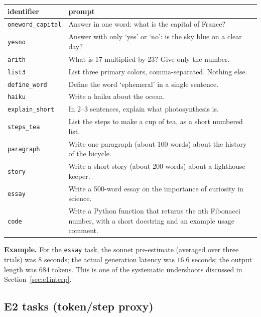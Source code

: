\documentclass[11pt]{article}
\newcommand{\code}[1]{\texttt{\small #1}}
\begin{document}
\begin{longtable}{@{}lp{11cm}@{}}
\toprule
identifier & prompt \\
\midrule
\endhead
\code{oneword\_capital} & Answer in one word: what is the capital of France? \\
\code{yesno}            & Answer with only `yes' or `no': is the sky blue on a clear day? \\
\code{arith}            & What is 17 multiplied by 23? Give only the number. \\
\code{list3}            & List three primary colors, comma-separated. Nothing else. \\
\code{define\_word}     & Define the word `ephemeral' in a single sentence. \\
\code{haiku}            & Write a haiku about the ocean. \\
\code{explain\_short}   & In 2--3 sentences, explain what photosynthesis is. \\
\code{steps\_tea}       & List the steps to make a cup of tea, as a short numbered list. \\
\code{paragraph}        & Write one paragraph (about 100 words) about the history of the bicycle. \\
\code{story}            & Write a short story (about 200 words) about a lighthouse keeper. \\
\code{essay}            & Write a 500-word essay on the importance of curiosity in science. \\
\code{code}             & Write a Python function that returns the nth Fibonacci number, with a short docstring and an example usage comment. \\
\bottomrule
\end{longtable}

\noindent\textbf{Example.} For the \code{essay} task, the sonnet pre-estimate (averaged over
three trials) was $8$ seconds; the actual generation latency was $16.6$ seconds; the output
length was $684$ tokens. This is one of the systematic undershoots discussed in
Section~\ref{sec:e1interp}.

\subsection{E2 tasks (token/step proxy)}
\label{app:e2tasks}
\end{document}

